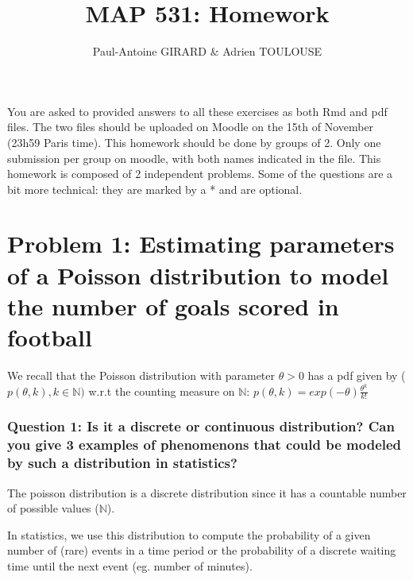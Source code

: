 \documentclass[]{article}
\title{MAP 531: Homework}
\author{Paul-Antoine GIRARD \& Adrien TOULOUSE}
\date{}
\begin{document}
\maketitle

You are asked to provided answers to all these exercises as both Rmd and
pdf files. The two files should be uploaded on Moodle on the 15th of
November (23h59 Paris time). This homework should be done by groups of
2. Only one submission per group on moodle, with both names indicated in
the file. This homework is composed of 2 independent problems. Some of
the questions are a bit more technical: they are marked by a * and are
optional.

\hypertarget{problem-1-estimating-parameters-of-a-poisson-distribution-to-model-the-number-of-goals-scored-in-football}{%
\section{Problem 1: Estimating parameters of a Poisson distribution to
model the number of goals scored in
football}\label{problem-1-estimating-parameters-of-a-poisson-distribution-to-model-the-number-of-goals-scored-in-football}}

We recall that the Poisson distribution with parameter \(\theta > 0\)
has a pdf given by (\(p(\theta, k), k \in \mathbb{N})\) w.r.t the
counting measure on \(\mathbb{N}\):
\(p(\theta, k) = exp(-\theta) \frac{\theta^k}{k!}\)

\hypertarget{question-1-is-it-a-discrete-or-continuous-distribution-can-you-give-3-examples-of-phenomenons-that-could-be-modeled-by-such-a-distribution-in-statistics}{%
\subsubsection{Question 1: Is it a discrete or continuous distribution?
Can you give 3 examples of phenomenons that could be modeled by such a
distribution in
statistics?}\label{question-1-is-it-a-discrete-or-continuous-distribution-can-you-give-3-examples-of-phenomenons-that-could-be-modeled-by-such-a-distribution-in-statistics}}

The poisson distribution is a discrete distribution since it has a
countable number of possible values (\(\mathbb{N}\)).

In statistics, we use this distribution to compute the probability of a
given number of (rare) events in a time period or the probability of a
discrete waiting time until the next event (eg. number of minutes).
\end{document}
